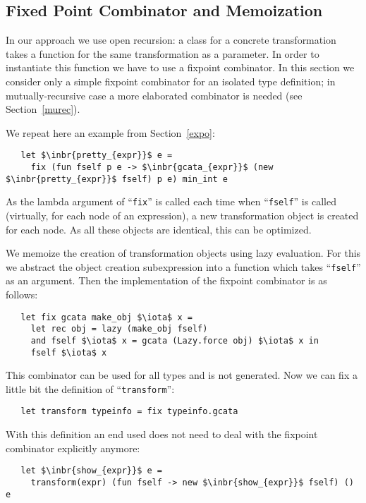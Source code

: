 \subsection{Fixed Point Combinator and Memoization}

In our approach we use open recursion: a class for a concrete transformation takes a function for the same transformation as a parameter. In order
to instantiate this function we have to use a fixpoint combinator. In this section we consider only a simple fixpoint combinator for an isolated
type definition; in mutually-recursive case a more elaborated combinator is needed (see Section~\ref{murec}).

We repeat here an example from Section~\ref{expo}:

\begin{lstlisting}
   let $\inbr{pretty_{expr}}$ e =
     fix (fun fself p e -> $\inbr{gcata_{expr}}$ (new $\inbr{pretty_{expr}}$ fself) p e) min_int e
\end{lstlisting}

As the lambda argument of ``\lstinline{fix}'' is called each time when ``\lstinline{fself}'' is called (virtually, for each node of
an expression), a new transformation object is created for each node. As all these objects are identical, this can be optimized. 

We memoize the creation of transformation objects using lazy evaluation. For this we abstract the object creation subexpression into a
function which takes ``\lstinline{fself}'' as an argument. Then the implementation of the fixpoint combinator is as follows:

\begin{lstlisting}
   let fix gcata make_obj $\iota$ x =
     let rec obj = lazy (make_obj fself)
     and fself $\iota$ x = gcata (Lazy.force obj) $\iota$ x in
     fself $\iota$ x
\end{lstlisting}

This combinator can be used for all types and is not generated. Now we can fix a little bit the definition of ``\lstinline{transform}'':

\begin{lstlisting}
   let transform typeinfo = fix typeinfo.gcata
\end{lstlisting}

With this definition an end used does not need to deal with the fixpoint combinator explicitly anymore:

\begin{lstlisting}
   let $\inbr{show_{expr}}$ e =
     transform(expr) (fun fself -> new $\inbr{show_{expr}}$ fself) () e
\end{lstlisting}


